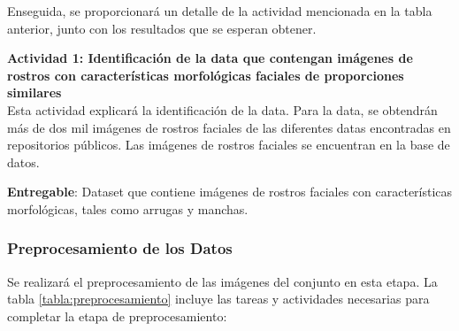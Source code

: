  
 
 Enseguida, se proporcionará un detalle de la actividad mencionada en la tabla anterior, junto con los resultados que se esperan obtener.
 
 \textbf{Actividad 1: Identificación de la data que contengan imágenes de rostros con características morfológicas faciales de proporciones similares}
 \\
 Esta actividad explicará la identificación de la data. Para la data, se obtendrán más de dos mil imágenes de rostros faciales de las diferentes datas encontradas en repositorios públicos. Las imágenes de rostros faciales se encuentran en la base de datos. 
 
 \textbf{Entregable}: Dataset que contiene imágenes de rostros faciales con características morfológicas, tales como arrugas y manchas.

\subsubsection{Preprocesamiento de los Datos}
Se realizará el preprocesamiento de las imágenes del conjunto en esta etapa. La tabla \ref{tabla:preprocesamiento} incluye las tareas y actividades necesarias para completar la etapa de preprocesamiento:
\vspace{2ex}


